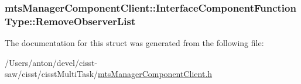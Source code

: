 \subsubsection[{Remove\+Observer\+List}]{ mts\+Manager\+Component\+Client\+::\+Interface\+Component\+Function\+Type\+::\+Remove\+Observer\+List}\label{structmts_manager_component_client_1_1_interface_component_function_type_a199fcb11e739ade7ff2b787b899ac5c3}


The documentation for this struct was generated from the following file\+:\begin{DoxyCompactItemize}
\item 
/\+Users/anton/devel/cisst-\/saw/cisst/cisst\+Multi\+Task/\hyperlink{mts_manager_component_client_8h}{mts\+Manager\+Component\+Client.\+h}\end{DoxyCompactItemize}
